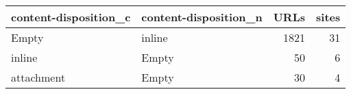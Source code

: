 \begin{tabular}{llrr}
\toprule
content-disposition\_c & content-disposition\_n &  URLs &  sites \\
\midrule
                Empty &                inline &  1821 &     31 \\
               inline &                 Empty &    50 &      6 \\
           attachment &                 Empty &    30 &      4 \\
\bottomrule
\end{tabular}
